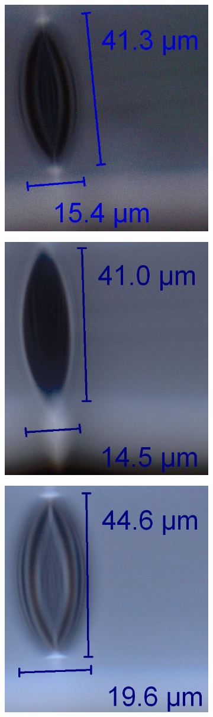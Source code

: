 \documentclass[]{spie}  %
\begin{document}
\begin{figure}[H]
\centering
	\begin{subfigure}{0.235\linewidth}
	\includegraphics[width=0.6\linewidth]{./Pictures/Bub3}
	\caption{}
	\label{fig:Bub3Image}
	\end{subfigure}
	\begin{subfigure}{0.3\linewidth}
	\centering
	\includegraphics[width=0.6\linewidth]{./Pictures/Bub6}
	\caption{}
	\label{fig:Bub6Image}
	\end{subfigure}
	\begin{subfigure}{0.3\linewidth}
	\centering
	\includegraphics[width=0.6\linewidth]{./Pictures/Bub9}

\end{subfigure}
\end{figure}
\end{document}
